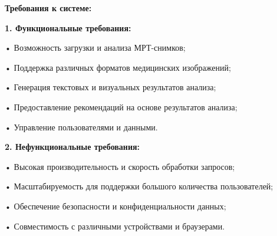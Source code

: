 {  \par \redline \textbf{Требования к системе:}

  \par \redline \textbf{1. Функциональные требования:}
  \par \redline \hspace{0.3cm} • Возможность загрузки и анализа МРТ-снимков;
  \par \redline \hspace{0.3cm} • Поддержка различных форматов медицинских изображений;
  \par \redline \hspace{0.3cm} • Генерация текстовых и визуальных результатов анализа;
  \par \redline \hspace{0.3cm} • Предоставление рекомендаций на основе результатов анализа;
  \par \redline \hspace{0.3cm} • Управление пользователями и данными.

  \par \redline \textbf{2. Нефункциональные требования:}
  \par \redline \hspace{0.3cm} • Высокая производительность и скорость обработки запросов;
  \par \redline \hspace{0.3cm} • Масштабируемость для поддержки большого количества пользователей;
  \par \redline \hspace{0.3cm} • Обеспечение безопасности и конфиденциальности данных;
  \par \redline \hspace{0.3cm} • Совместимость с различными устройствами и браузерами.


}
